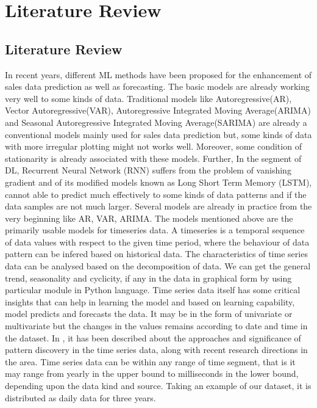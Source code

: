 
\chapter{Literature Review} %

\label{c2} %


\section{Literature Review}
In recent years, different ML methods have been proposed for the enhancement of sales data prediction as well as forecasting. The basic models are already working very well to some kinds of data. Traditional models like Autoregressive(AR), Vector Autoregressive(VAR), Autoregressive Integrated Moving Average(ARIMA)\cite{schaidnagel2013sales} and Seasonal Autoregressive Integrated Moving Average(SARIMA) are already a conventional models mainly used for sales data prediction but, some kinds of data with more irregular plotting might not works well. Moreover, some condition of stationarity is already associated with these models. Further, In the segment of DL, Recurrent Neural Network (RNN) suffers from the problem of vanishing gradient \cite{janiesch2021machine} and of its modified models known as Long Short Term Memory (LSTM), cannot able to predict much effectively to some kinds of data patterns and if the data samples are not much larger. \cite{purushotham2018benchmarking} Several models are already in practice from the very beginning like AR, VAR, ARIMA. The models mentioned above are the primarily usable models for timeseries data. A timeseries is a temporal sequence of data values with respect to the given time period, where the behaviour of data pattern can be infered based on historical data. \cite{cerqueira2020evaluating} The characteristics of time series data can be analysed based on the decomposition of data. We can get the general trend, seasonality and cyclicity, if any in the data in graphical form by using particular module in Python language. Time series data itself has some critical insights that can help in learning the model and based on learning capability, model predicts and forecasts the data. It may be in the form of univariate \cite{petropoulos2021wisdom} or multivariate but the changes in the values remains according to date and time in the dataset. In \cite{fu2011review}, it has been described about the approaches and significance of pattern discovery in the time series data, along with recent research directions in the area. Time series data can be within any range of time segment, that is it may range from yearly in the upper bound to milliseconds in the lower bound, depending upon the data kind and source. Taking an example of our dataset, it is distributed as daily data for three years.

